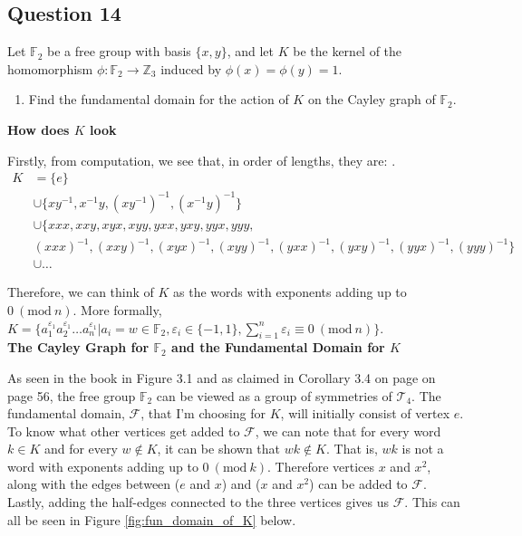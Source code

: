 \documentclass[12pt]{article}%
\newcommand{\F}{\mathbb{F}}
\newcommand{\Z}{\mathbb{Z}}
\newcommand{\Mod}[1]{\ (\mathrm{mod}\ #1)}
\begin{document}
\subsection*{Question 14}

Let $\F_2$ be a free group with basis $\{x,y\}$, and let $K$
 be the kernel of the homomorphism $\phi:\F_2\rightarrow \Z_3$ induced by $\phi(x)=\phi(y)=1$.

\renewcommand{\labelenumi}{\alph{enumi}}
\begin{enumerate}
  \item Find the fundamental domain for the action of $K$ on the Cayley graph of $\F_2$.
\end{enumerate}

\textbf{How does $K$ look}

Firstly, from computation, we see that, in order of lengths, they are: . 
\begin{align*}
K
&=\{e\} \\
&\cup\{xy^{-1}, x^{-1}y, (xy^{-1})^{-1}, (x^{-1}y)^{-1}\} \\
&\cup\{xxx,xxy,xyx,xyy,yxx,yxy,yyx,yyy, \\
&(xxx)^{-1},(xxy)^{-1},(xyx)^{-1},(xyy)^{-1},(yxx)^{-1},(yxy)^{-1},(yyx)^{-1},(yyy)^{-1}\} \\
&\cup \ldots
\end{align*}


Therefore, we can think of $K$ as the words with exponents adding up to $0 \Mod{n}$. More formally, $K=\{a_{1}^{\varepsilon_1}a_{2}^{\varepsilon_1}\ldots a_{n}^{\varepsilon_1} | a_i=w\in \F_2, \varepsilon_i\in \{-1, 1\}, \sum_{i=1}^{n} \varepsilon_i \equiv 0 \Mod{n}\}$. \\

\textbf{The Cayley Graph for $\F_2$ and the Fundamental Domain for $K$}

As seen in the book in Figure 3.1 and as claimed in Corollary 3.4 on page on page 56, the free group $\F_2$ can be viewed as a group of symmetries of $\mathcal{T}_4$. The fundamental domain, $\mathcal{F}$, that I'm choosing for $K$, will initially consist of vertex $e$. To know what other vertices get added to $\mathcal{F}$, we can note that for every word $k\in K$ and for every $w\not\in K$, it can be shown that $wk\not\in K$. That is, $wk$ is not a word with exponents adding up to $0\Mod{k}$. Therefore vertices $x$ and $x^2$, along with the edges between ($e$ and $x$) and ($x$ and $x^2$) can be added to $\mathcal{F}$. Lastly, adding the half-edges connected to the three vertices gives us $\mathcal{F}$. This can all be seen in Figure \ref{fig:fun_domain_of_K} below.
\end{document}
